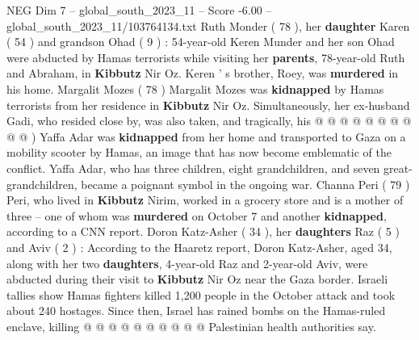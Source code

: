 \begin{textsample}{NEG Dim 7 – global\_south\_2023\_11 – Score -6.00 – global\_south\_2023\_11/103764134.txt}
Ruth Monder ( 78 ), her \textbf{daughter} Karen ( 54 ) and grandson Ohad ( 9 ) : 54-year-old Keren Munder and her son Ohad were abducted by Hamas terrorists while visiting her \textbf{parents}, 78-year-old Ruth and Abraham, in \textbf{Kibbutz} Nir Oz.
Keren ' s brother, Roey, was \textbf{murdered} in his home.
Margalit Mozes ( 78 ) Margalit Mozes was \textbf{kidnapped} by Hamas terrorists from her residence in \textbf{Kibbutz} Nir Oz.
Simultaneously, her ex-husband Gadi, who resided close by, was also taken, and tragically, his @ @ @ @ @ @ @ @ @ @ ) Yaffa Adar was \textbf{kidnapped} from her home and transported to Gaza on a mobility scooter by Hamas, an image that has now become emblematic of the conflict.
Yaffa Adar, who has three children, eight grandchildren, and seven great-grandchildren, became a poignant symbol in the ongoing war.
Channa Peri ( 79 ) Peri, who lived in \textbf{Kibbutz} Nirim, worked in a grocery store and is a mother of three -- one of whom was \textbf{murdered} on October 7 and another \textbf{kidnapped}, according to a CNN report.
Doron Katz-Asher ( 34 ), her \textbf{daughters} Raz ( 5 ) and Aviv ( 2 ) : According to the Haaretz report, Doron Katz-Asher, aged 34, along with her two \textbf{daughters}, 4-year-old Raz and 2-year-old Aviv, were abducted during their visit to \textbf{Kibbutz} Nir Oz near the Gaza border.
Israeli tallies show Hamas fighters killed 1,200 people in the October attack and took about 240 hostages.
Since then, Israel has rained bombs on the Hamas-ruled enclave, killing @ @ @ @ @ @ @ @ @ @ Palestinian health authorities say.

\end{textsample}

